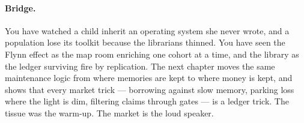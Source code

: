 \paragraph{Bridge.} You have watched a child inherit an operating system she never wrote, and a population lose its toolkit because the librarians thinned. You have seen the Flynn effect as the map room enriching one cohort at a time, and the library as the ledger surviving fire by replication. The next chapter moves the same maintenance logic from where memories are kept to where money is kept, and shows that every market trick --- borrowing against slow memory, parking loss where the light is dim, filtering claims through gates --- is a ledger trick. The tissue was the warm-up. The market is the loud speaker.
